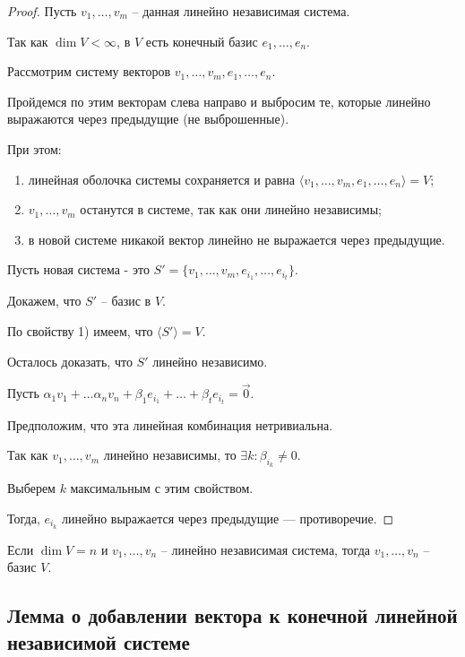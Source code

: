 \begin{proof}
    Пусть $v_1, \dots, v_m$ -- данная линейно независимая система.

    Так как $\dim V < \infty$, в $V$ есть конечный базис $e_1, \dots, e_n$.

    Рассмотрим систему векторов $v_1, \dots, v_m, e_1, \dots, e_n$.

    Пройдемся по этим векторам слева направо и выбросим те, которые линейно выражаются через предыдущие (не выброшенные).

    При этом:
    \begin{enumerate}[nosep, label=\arabic*)]
    \item линейная оболочка системы сохраняется и равна $\langle v_1, \dots, v_m, e_1, \dots, e_n \rangle = V$;
    \item $v_1, \dots, v_m$ останутся в системе, так как они линейно независимы;
    \item в новой системе никакой вектор линейно не выражается через предыдущие.
    \end{enumerate}

    Пусть новая система - это $S' = \{v_1, \dots, v_m, e_{i_1}, \dots, e_{i_t}\}$.

    Докажем, что $S'$ -- базис в $V$.

    По свойству 1) имеем, что $\langle S' \rangle = V$.

    Осталось доказать, что $S'$ линейно независимо.

    Пусть $\alpha_1 v_1 + \dots \alpha_n v_n + \beta_1 e_{i_1} + \dots + \beta_t e_{i_t} = \overrightarrow{0}$.

    Предположим, что эта линейная комбинация нетривиальна.

    Так как $v_1, \dots, v_m$ линейно независимы, то $\exists k : \beta_{i_k} \neq 0$.

    Выберем $k$ максимальным с этим свойством.

    Тогда, $e_{i_k}$ линейно выражается через предыдущие --- противоречие.
\end{proof}

\begin{corollary}
    Если $\dim V = n$ и $v_1, \dots, v_n$ -- линейно независимая система, тогда $v_1, \dots, v_n$ -- базис $V$.
\end{corollary}

\subsection{Лемма о добавлении вектора к конечной линейной независимой системе}

